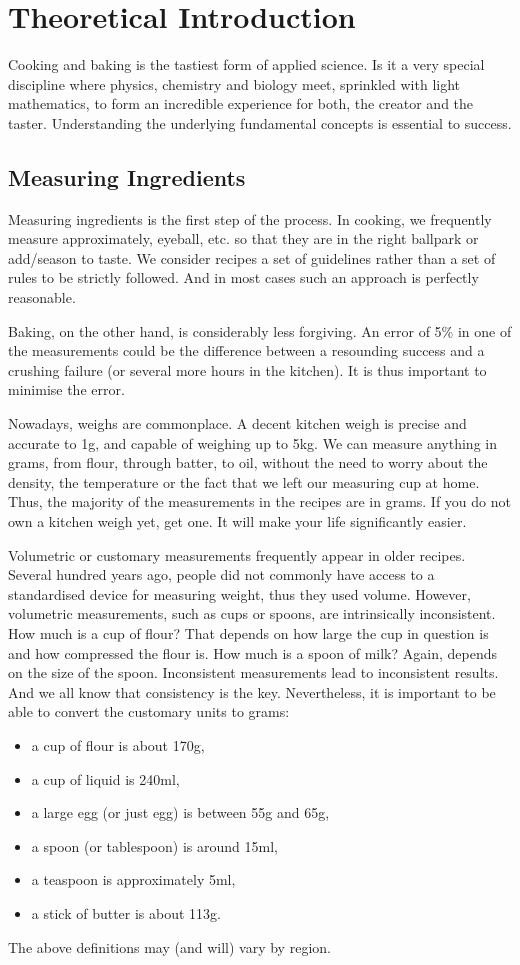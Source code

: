 \chapter{Theoretical Introduction}
Cooking and baking is the tastiest form of applied science. Is it a very
special discipline where physics, chemistry and biology meet, sprinkled with
light mathematics, to form an incredible experience for both, the creator and
the taster. Understanding the underlying fundamental concepts is essential to
success.

\section{Measuring Ingredients}
Measuring ingredients is the first step of the process. In cooking, we
frequently measure approximately, eyeball, etc. so that they are in the right
ballpark or add/season to taste. We consider recipes a set of guidelines rather
than a set of rules to be strictly followed. And in most cases such an approach
is perfectly reasonable.

Baking, on the other hand, is considerably less forgiving. An error of 5\% in
one of the measurements could be the difference between a resounding success
and a crushing failure (or several more hours in the kitchen). It is thus
important to minimise the error.

Nowadays, weighs are commonplace. A decent kitchen weigh is precise and
accurate to 1g, and capable of weighing up to 5kg. We can measure anything in
grams, from flour, through batter, to oil, without the need to worry about the
density, the temperature or the fact that we left our measuring cup at home.
Thus, the majority of the measurements in the recipes are in grams. If you do
not own a kitchen weigh yet, get one. It will make your life significantly
easier.

Volumetric or customary measurements frequently appear in older recipes.
Several hundred years ago, people did not commonly have access to a
standardised device for measuring weight, thus they used volume. However,
volumetric measurements, such as cups or spoons, are intrinsically
inconsistent. How much is a cup of flour? That depends on how large the cup in
question is and how compressed the flour is. How much is a spoon of milk?
Again, depends on the size of the spoon. Inconsistent measurements lead to
inconsistent results. And we all know that consistency is the key.
Nevertheless, it is important to be able to convert the customary units to
grams:
\begin{itemize}
\item a cup of flour is about 170g,
\item a cup of liquid is 240ml,
\item a large egg (or just egg) is between 55g and 65g,
\item a spoon (or tablespoon) is around 15ml,
\item a teaspoon is approximately 5ml,
\item a stick of butter is about 113g.
\end{itemize}
The above definitions may (and will) vary by region.


